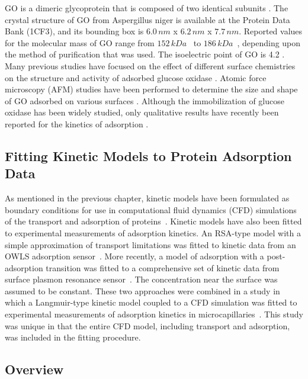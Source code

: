 GO is a dimeric glycoprotein that is composed of two identical subunits
\cite{Wohlfahrt1999}. The crystal structure of GO from Aspergillus
niger is available at the Protein Data Bank (1CF3), and its bounding
box is $6.0\, nm$ x $6.2\, nm$ x $7.7\, nm$. Reported values for
the molecular mass of GO range from $152\, kDa$~\cite{Keilin1948}
to $186\, kDa$~\cite{Swoboda1965}, depending upon the method of
purification that was used. The isoelectric point of GO is 4.2 \cite{Pazur1964}.
Many previous studies have focused on the effect of different surface
chemistries on the structure and activity of adsorbed glucose oxidase
\cite{Fears2009,Dong1997}. Atomic force microscopy (AFM) studies
have been performed to determine the size and shape of GO adsorbed
on various surfaces \cite{Muguruma2006,Otsuka2004}. Although the
immobilization of glucose oxidase has been widely studied, only qualitative
results have recently been reported for the kinetics of adsorption
\cite{Muguruma2006}.


\subsection{Fitting Kinetic Models to Protein Adsorption Data}

As mentioned in the previous chapter, kinetic models have been formulated
as boundary conditions for use in computational fluid dynamics (CFD)
simulations of the transport and adsorption of proteins~\cite{Glaser1993,Edwards1999}.
Kinetic models have also been fitted to experimental measurements
of adsorption kinetics. An RSA-type model with a simple approximation
of transport limitations was fitted to kinetic data from an OWLS adsorption
sensor~\cite{Kurrat1994}. More recently, a model of adsorption with
a post-adsorption transition \cite{Lundstroem1984} was fitted to
a comprehensive set of kinetic data from surface plasmon resonance
sensor~\cite{Michael2003}. The concentration near the surface was
assumed to be constant. These two approaches were combined in a study
in which a Langmuir-type kinetic model coupled to a CFD simulation
was fitted to experimental measurements of adsorption kinetics in
microcapillaries~\cite{Jenkins2004}. This study was unique in that
the entire CFD model, including transport and adsorption, was included
in the fitting procedure.


\subsection{Overview}

